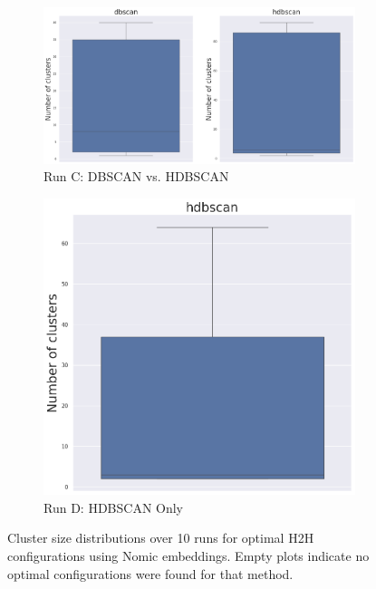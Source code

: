 \documentclass[10pt,oneside]{report}
\begin{document}
\begin{figure}[H]
    \ContinuedFloat
    \centering
    \begin{subfigure}[b]{\textwidth}
        \centering
        \includegraphics[width=\textwidth]{./images/nomic_dbscanvshdbscan_whisker.png}
        \caption{Run C: DBSCAN vs. HDBSCAN}\label{fig:nomic_h2h_runc}
    \end{subfigure}
    \hfill
    \begin{subfigure}[b]{0.48\textwidth}
        \centering
        \includegraphics[width=\textwidth]{./images/nomic_hdbscan_whisker.png}
        \caption{Run D: HDBSCAN Only}\label{fig:nomic_h2h_rund}
    \end{subfigure}
    \caption{Cluster size distributions over 10 runs for optimal H2H configurations using Nomic embeddings. Empty plots indicate no optimal configurations were found for that method.}
    \label{fig:nomic_h2h_whisker_appendix}
\end{figure}
\end{document}
